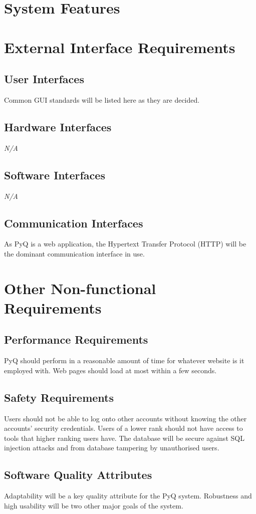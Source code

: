 \documentclass{report}
\begin{document}
  \section{System Features}
  \section{External Interface Requirements}
   \subsection{User Interfaces}
   Common GUI standards will be listed here as they are decided.
   \subsection{Hardware Interfaces}
   \textit{N/A}
   \subsection{Software Interfaces}
   \textit{N/A}
   \subsection{Communication Interfaces}
   As PyQ is a web application, the Hypertext Transfer Protocol (HTTP) will be the dominant communication interface in use.
  \section{Other Non-functional Requirements}
   \subsection{Performance Requirements}
   PyQ should perform in a reasonable amount of time for whatever website is it employed with. Web pages should load at most within a few seconds.
   \subsection{Safety Requirements}
   Users should not be able to log onto other accounts without knowing the other accounts' security credentials. Users of a lower rank should not have access to tools that higher ranking users have. The database will be secure against SQL injection attacks and from database tampering by unauthorised users.
   \subsection{Software Quality Attributes}
   Adaptability will be a key quality attribute for the PyQ system. Robustness and high usability will be two other major goals of the system.
\end{document}
